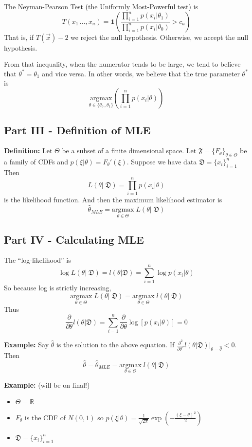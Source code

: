 \documentclass[12pt]{article}
\newcommand{\R}{\mathbb{R}}
\begin{document}
The Neyman-Pearson Test (the Uniformly Most-Powerful test) is 
\[T(x_1\, ..., x_n) = \mathbf{1}\left(\frac{\prod_{i=1}^n p(x_i | \theta_1)}{\prod_{i=1}^n p(x_i | \theta_0)} > c_a\right)\]
That is, if $T(\vec{x}) - 2$ we reject the null hypothesis. Otherwise, we accept the null hypothesis. 

From that inequality, when the numerator tends to be large, we tend to believe that $\theta^* = \theta_1$ and vice versa. In other words, we believe that the true parameter $\theta^*$ is 
\[\underset{\theta \in \{\theta_0\, , \theta_1\}}{\text{argmax}}\left(\prod_{i=1}^n p(x_i | \theta)\right)\]

\subsection*{Part III - Definition of MLE}
\textbf{Definition:} Let $\Theta$ be a subset of a finite dimensional space. Let $\mathfrak{F} = \{F_\theta\}_{\theta \in \Theta}$ be a family of CDFs and $p(\xi | \theta) = F_\theta' (\xi)$. Suppose we have data $\mathfrak{D} = \{x_i\}_{i=1}^n$
Then 
\[L(\theta | \; \mathfrak{D}) = \prod_{i=1}^n p(x_i | \theta)\]
is the likelihood function. And then the maximum likelihood estimator is 
\[\hat{\theta}_{MLE} = \underset{\theta \in \Theta}{\text{argmax}}\; L(\theta | \; \mathfrak{D})\]

\subsection*{Part IV - Calculating MLE}
The ``log-likelihood'' is 
\[\log  L(\theta | \; \mathfrak{D}) = l(\theta | \mathfrak{D}) = \sum_{i=1}^n \log p(x_i | \theta)\]
So because log is strictly increasing, 
\[\underset{\theta \in \Theta}{\text{argmax}}\; L(\theta | \; \mathfrak{D}) =  \underset{\theta \in \Theta}{\text{argmax}}\; l(\theta | \; \mathfrak{D})\]
Thus 
\[\boxed{\frac{\partial}{\partial \theta}l(\theta | \mathfrak{D}) = \sum_{i=1}^n \frac{\partial}{\partial \theta}\log[p(x_i | \theta)] = 0}\]

\textbf{Example:} Say $\hat \theta$ is the solution to the above equation. If $\frac{\partial^2}{\partial \theta^2}l(\theta | \mathfrak{D}) \big|_{\theta = \hat{\theta}} < 0$. Then 
\[\hat{\theta} = \hat{\theta}_{MLE} =  \underset{\theta \in \Theta}{\text{argmax}}\; l(\theta | \; \mathfrak{D})\]

\textbf{Example:} (will be on final!)
\begin{itemize}
    \item $\Theta = \R$
    \item $F_\theta$ is the CDF of $N(0, 1)$ so $p(\xi | \theta) = \frac{1}{\sqrt{2\pi}} \exp(-\frac{(\xi - \theta)^2}{2})$
    \item $\mathfrak{D} = \{x_i\}_{i=1}^n$
\end{itemize}
\end{document}
